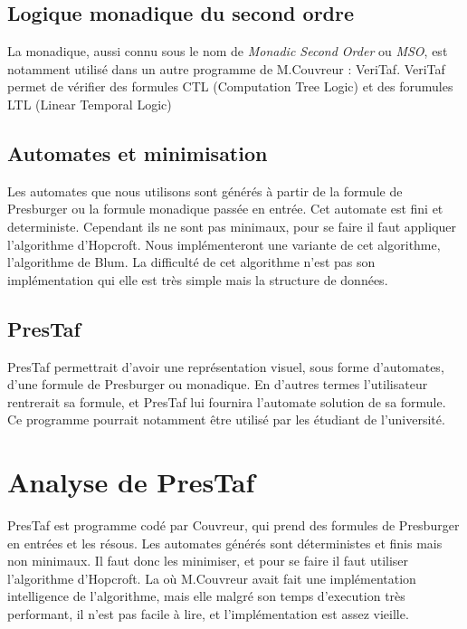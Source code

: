\documentclass{article}%
\begin{document}
\subsection{Logique monadique du second ordre}

La \gls{monadique}, aussi connu sous le nom de \emph{Monadic Second Order} ou \emph{MSO}, est notamment utilisé dans un autre programme de M.Couvreur : VeriTaf. VeriTaf permet de vérifier des formules CTL (Computation Tree Logic) et des forumules LTL (Linear Temporal Logic)

\subsection{Automates et minimisation}

Les automates que nous utilisons sont générés à partir de la formule de Presburger ou la formule monadique passée en entrée. Cet automate est fini et deterministe. Cependant ils ne sont pas minimaux, pour se faire il faut appliquer l'algorithme d'Hopcroft\cite{hopcroft1971n}. Nous implémenteront une variante de cet algorithme, l'algorithme de Blum\cite{blum1996nlogn}. La difficulté de cet algorithme n'est pas son implémentation qui elle est très simple mais la structure de données.

\subsection{PresTaf}

PresTaf permettrait d'avoir une représentation visuel, sous forme d'automates, d'une formule de Presburger ou monadique. En d'autres termes l'utilisateur rentrerait sa formule, et PresTaf lui fournira l'automate solution de sa formule. Ce programme pourrait notamment être utilisé par les étudiant de l'université.

\section{Analyse de PresTaf}

PresTaf est programme codé par Couvreur, qui prend des formules de Presburger en entrées et les résous. Les automates générés sont déterministes et finis mais non minimaux. Il faut donc les minimiser, et pour se faire il faut utiliser l'algorithme d'Hopcroft. La où M.Couvreur avait fait une implémentation intelligence de l'algorithme, mais elle malgré son temps d'execution très performant, il n'est pas facile à lire, et l'implémentation est assez vieille.
\end{document}
